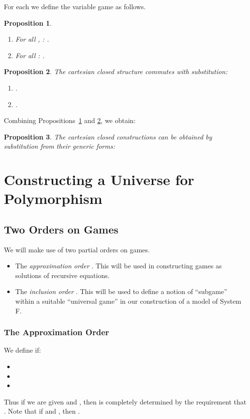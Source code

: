 \documentclass[a4paper,11pt]{article}
\newtheorem{proposition}{Proposition}[section]
\begin{document}
\noindent For each  we define the variable game  as follows.


\begin{proposition}
\label{sub0}
\begin{enumerate}
\item For all , : .
\item For all : .
\end{enumerate}
\end{proposition}



\begin{proposition}
\label{sub1}
The cartesian closed structure commutes with substitution:
\begin{enumerate}
\item .
\item .
\end{enumerate}
\end{proposition}
Combining Propositions~\ref{sub0} and \ref{sub1}, we obtain:

\begin{proposition}
The cartesian closed constructions can be obtained by substitution
from their generic forms:

\end{proposition}

\section{Constructing a Universe for Polymorphism}
\label{order}
\subsection{Two Orders on Games}
We will make use of two partial orders on games.

\begin{itemize}
\item The \emph{approximation order} . This will be
  used in constructing games as solutions of recursive equations.

\item The \emph{inclusion order} . This will be used to
  define a notion of ``subgame'' within a suitable ``universal game''
  in our construction of a model of System F.
\end{itemize}

\subsubsection{The Approximation Order}
We define  if:
\begin{itemize}
\item 
\item 
\item 
\end{itemize}
Thus if we are given  and , then  is
completely determined by the requirement that . Note
that if  and , then .
\end{document}
